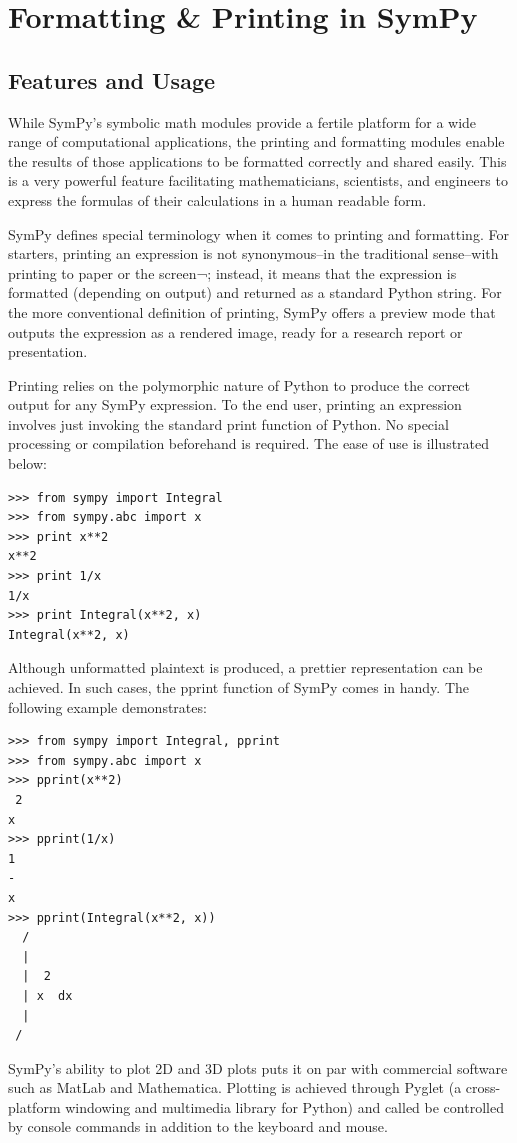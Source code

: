 \documentclass[11pt]{article}
\begin{document}
\section{Formatting \& Printing in SymPy}
\subsection{Features and Usage}
While SymPy’s symbolic math modules provide a fertile platform for a wide range of computational applications, the printing and formatting modules enable the results of those applications to be formatted correctly and shared easily. This is a very powerful feature facilitating mathematicians, scientists, and engineers to express the formulas of their calculations in a human readable form.

SymPy defines special terminology when it comes to printing and formatting. For starters, printing an expression is not synonymous–in the traditional sense–with printing to paper or the screen¬; instead, it means that the expression is formatted (depending on output) and returned as a standard Python string. For the more conventional definition of printing, SymPy offers a preview mode that outputs the expression as a rendered image, ready for a research report or presentation.

Printing relies on the polymorphic nature of Python to produce the correct output for any SymPy expression. To the end user, printing an expression involves just invoking the standard print function of Python. No special processing or compilation beforehand is required. The ease of use is illustrated below:

\begin{lstlisting}
>>> from sympy import Integral
>>> from sympy.abc import x
>>> print x**2
x**2
>>> print 1/x
1/x
>>> print Integral(x**2, x)
Integral(x**2, x)
\end{lstlisting}

Although unformatted plaintext is produced, a prettier representation can be achieved. In such cases, the pprint function of SymPy comes in handy. The following example demonstrates:

\begin{lstlisting}
>>> from sympy import Integral, pprint
>>> from sympy.abc import x
>>> pprint(x**2)
 2
x
>>> pprint(1/x)
1
-
x
>>> pprint(Integral(x**2, x))
  /
  |
  |  2
  | x  dx
  |
 /
\end{lstlisting}

SymPy’s ability to plot 2D and 3D plots puts it on par with commercial software such as MatLab and Mathematica. Plotting is achieved through Pyglet (a cross-platform windowing and multimedia library for Python) and called be controlled by console commands in addition to the keyboard and mouse. 
\end{document}
